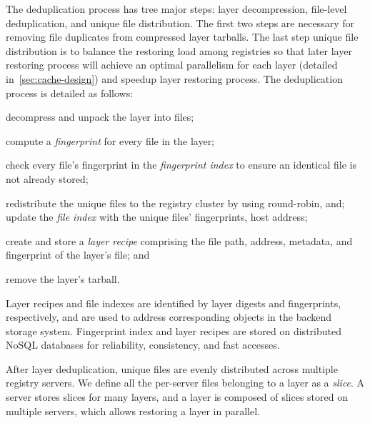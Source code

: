 The deduplication process has tree major steps: layer decompression, file-level deduplication,
and unique file distribution. 
The first two steps are necessary for removing file duplicates from compressed layer tarballs.
The last step unique file distribution is to balance the restoring load among registries so that later layer restoring process will achieve an optimal parallelism for each layer (detailed in~\ref{sec:cache-design}) and speedup layer restoring process.
The deduplication process is detailed as follows:
\begin{compactenumerate}
	\item decompress and unpack the layer into files;
	\item compute a \emph{fingerprint} for every file in the layer;
	\item check every file's fingerprint in the \emph{fingerprint index} to
	ensure an identical file is not already stored;
	\item redistribute the unique files to the registry cluster by using round-robin, and;
	 update the \emph{file index} with the unique files' fingerprints, host address;
	\item create and store a \emph{layer recipe} comprising the file path, address,
	metadata, and fingerprint of the layer's file; and
	\item remove the layer's tarball.
\end{compactenumerate}

Layer recipes and file indexes are identified by layer digests and fingerprints, respectively, and 
are used to address corresponding objects in the backend storage system. 
Fingerprint index and layer recipes are stored on distributed NoSQL databases
for reliability, consistency, and fast accesses.

After layer deduplication, unique files are evenly distributed across multiple registry servers. 
We define all the per-server files belonging to a layer as a {\em slice}. 
A server stores slices for many layers, and a layer is composed of slices stored on multiple servers, which allows restoring a layer in parallel. 

